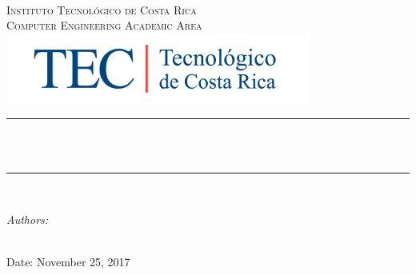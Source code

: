 \begin{titlepage}

\newcommand{\HRule}{\rule{\linewidth}{0.5mm}} %

\begin{center} %


\textsc{\LARGE \reporttype}\\[1.5cm] 
\textsc{\Large Instituto Tecnol\'ogico de Costa Rica}\\[0.5cm] 
\textsc{\large Computer Engineering Academic Area}\\[0.5cm]


\includegraphics[width = 10cm]{./figures/MarcaTECRGB}\\[0.5cm] 


\HRule \\[0.4cm]
{ \huge \bfseries \reporttitle}\\ %
\HRule \\[1.5cm]
\end{center}

\begin{flushleft} \large
\textit{Authors:}\\
\reportauthor\\ %
\end{flushleft}
\vspace{2cm}
\makeatletter
Date: November 25, 2017

\vfill %



\makeatother


\end{titlepage}

